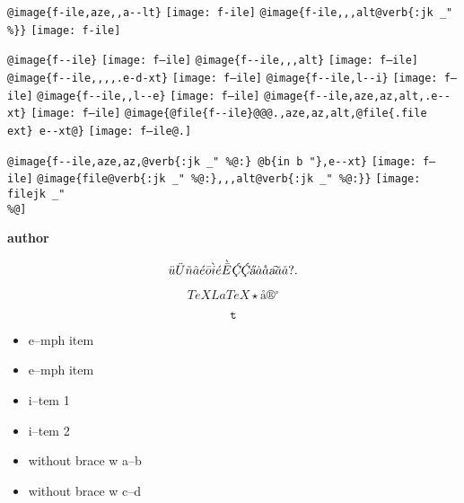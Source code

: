 \documentclass{book}
\renewcommand{\includegraphics}[1]{\fbox{FIG \detokenize{#1}}}
\begin{document}
\texttt{@image\{f-ile,aze{,}{,}a{-}{-}lt\}} \texttt{[image: f-ile]}
\texttt{@image\{f-ile{,}{,},alt@verb\{:jk \_" \%\@\}\}} \texttt{[image: f-ile]}

\texttt{@image\{f{-}{-}ile\}} \texttt{[image: f--ile]}
\texttt{@image\{f{-}{-}ile{,}{,},alt\}} \texttt{[image: f--ile]}
\texttt{@image\{f{-}{-}ile{,}{,}{,}{,}.e-d-xt\}} \texttt{[image: f--ile]}
\texttt{@image\{f{-}{-}ile,l{-}{-}i\}} \texttt{[image: f--ile]}
\texttt{@image\{f{-}{-}ile{,}{,}l{-}{-}e\}} \texttt{[image: f--ile]}
\texttt{@image\{f{-}{-}ile,aze,az,alt,.e{-}{-}xt\}} \texttt{[image: f--ile]}
\texttt{@image\{@file\{f{-}{-}ile\}@@@.,aze,az,alt,@file\{.file ext\}\ e{-}{-}xt@\}} \texttt{[image: f--ile@.]}

\texttt{@image\{f{-}{-}ile,aze,az,@verb\{:jk \_" \%@:\}\ @b\{in b "\},e{-}{-}xt\}} \texttt{[image: f--ile]}
\texttt{@image\{file@verb\{:jk \_" \%@:\}{,}{,},alt@verb\{:jk \_" \%@:\}\}} \texttt{[image: filejk \_" \\\%@]}


{\bfseries author}%

$$
\ddot{u} \ddot{U} \tilde{n} \hat{a} \acute{e} \bar{o} \grave{i} \acute{e} \grave{\bar{E}}
\textsl{\c{\'{C}}} \textsl{\c{\'{C}}} \textsl{\H{a}} \dot{a} \mathring{a} \textsl{\t{a}}
\breve{a} \check{a}
 ? .
$$

$$
TeX LaTeX \star{} \mathord{\text{\aa{}}} \circledR{} ^{\circ{}} 
$$

$$
\mathtt{t} 
$$

\begin{itemize}[label=\emph{}]
\item e--mph item
\end{itemize}

\begin{itemize}[label=\emph{} after emph]
\item e--mph item
\end{itemize}

\begin{itemize}[label=\textbullet{} a--n itemize line]
\item i--tem 1
\item i--tem 2
\end{itemize}

\begin{itemize}[label={}]
\item without brace w a--b
\item without brace w c--d
\end{itemize}
\end{document}
